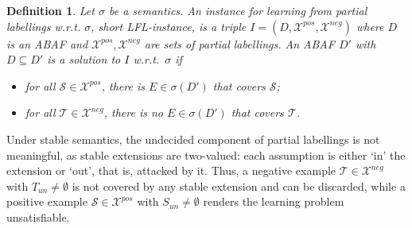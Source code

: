 \documentclass[letterpaper]{article} %
\newcommand{\nb}[1]{\textcolor{red}{!}\marginpar{\textcolor{red}{#1}}}
\newcommand{\stb}{\textit{st}}
\newcommand{\atoms}{\mathcal{L}}
\newcommand{\ruleset}{\mathcal{R}}
\newcommand{\assumptions}{\mathcal{A}}
\newcommand{\contra}{c}
\newcommand{\ABAdef}{D=(\atoms,\ruleset,\assumptions,\contra)}
\newcommand{\Xpos}{\mathcal{X}^{pos}}
\newcommand{\Xneg}{\mathcal{X}^{neg}}
\newtheorem{definition}[example]{Definition}
\newtheorem{observation}[example]{Observation}
\begin{document}
\begin{definition}\label{def:LFL}
Let $\sigma$ be a semantics. An \emph{instance for learning from partial labellings w.r.t. $\sigma$}, short \emph{LFL-instance}, is a triple $I=(D,\Xpos,\Xneg)$ where $D$ is an ABAF and $\Xpos,\Xneg$ are sets of partial labellings.
An ABAF $D'$ with $D\subseteq D'$ is a \emph{solution} to $I$ w.r.t.\ $\sigma$ if
\begin{itemize}
\item for all $\mathcal S\in \Xpos$, there is $E\in \sigma(D')$ that covers $\mathcal S$;
\item 
for all $\mathcal T\in \Xneg$, there is no $E\in \sigma(D')$ that covers $\mathcal T$.
\end{itemize} 
% 
\end{definition}
Under stable semantics, the undecided component of partial labellings is not meaningful, as stable extensions are two-valued: each assumption is either `in'  the extension or `out', that is, attacked by it.
Thus, a negative example $\mathcal T\in \Xneg$ with $T_{un}\neq \emptyset$ is not covered by any stable extension and can be discarded,
while a positive example $\mathcal S\in\Xpos$ with $S_{un}\neq \emptyset$ renders the learning problem unsatisfiable.
\end{document}
